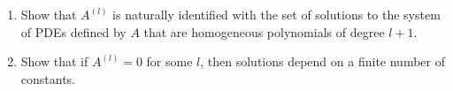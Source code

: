 \begin{xca}
    \begin{enumerate}
        \item Show that $A^{(l)}$ is naturally identified with the set of solutions to the system of PDEs defined by $A$ that are homogeneous polynomials of degree $l+1$.
        \item Show that if $A^{(l)}=0$ for some $l$, then solutions depend on a finite number of constants.
    \end{enumerate}
\end{xca}







